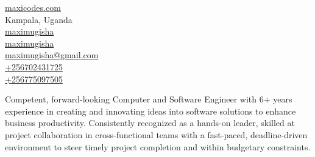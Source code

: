 \documentclass[]{plushcv}
\begin{document}
%
%


\begin{multicols}{2}
\color{BlueGreen}
{\faHome} \quad
{\href{https://www.maxicodes.com}{ maxicodes.com}} \\

{\faMapMarker} \quad
{Kampala, Uganda} \\

{\faGithub} \quad
{\href{https://www.github.com/maximugisha}{maximugisha}} \\

{\faLinkedin} \quad
{\href{https://www.linkedin.com/in/maximugisha}{maximugisha}} \\

{\faEnvelope} \quad
{\href{mailto:maximugisha@gmail.com} {maximugisha@gmail.com}} \\

{\faWhatsapp} \quad
{\href{tel:+256702431725}{+256702431725}} \\

{\faPhone} \quad
{\href{tel:+256775097505}{+256775097505}} \\
\end{multicols}

\vspace{\topsep}

{Competent, forward-looking Computer and Software Engineer with 6+ years experience in creating and  innovating ideas into software solutions to enhance business productivity. Consistently recognized as a hands-on leader, skilled at project collaboration in cross-functional teams with a fast-paced, deadline-driven environment to steer timely project completion and within budgetary constraints.}
\sectionsep
\sectionsep





\end{document}
